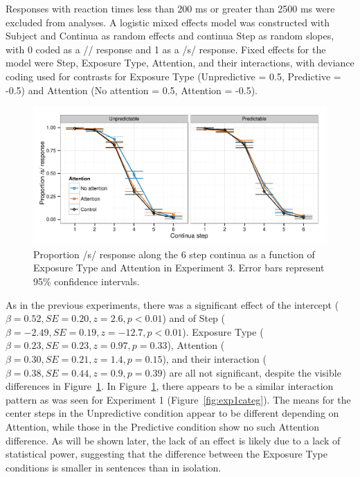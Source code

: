 Responses with reaction times less than 200 ms or greater than 2500 ms were excluded from analyses. 
A logistic mixed effects model was constructed with Subject and Continua as random effects and continua Step as random slopes, with 0 coded as a /\textesh/ response and 1 as a /s/ response.  Fixed effects for the model were Step, Exposure Type, Attention, and their interactions, with deviance coding used for contrasts for Exposure Type (Unpredictive = 0.5, Predictive = -0.5) and Attention (No attention = 0.5, Attention = -0.5).


\begin{figure}[!ht]
\caption{Proportion /s/ response along the 6 step continua as a function of Exposure Type and Attention in Experiment 3.  Error bars represent 95\% confidence intervals.}
\label{fig:exp3categ}
\begin{center}
\includegraphics[width=\textwidth]{graphs/exp3_categresults}
\end{center}
\end{figure}

As in the previous experiments, there was a significant effect of the intercept ($\beta = 0.52, SE = 0.20, z = 2.6, p < 0.01$) and of Step ($\beta = -2.49, SE = 0.19, z = -12.7, p < 0.01$).
Exposure Type ($\beta = 0.23, SE = 0.23, z = 0.97, p = 0.33$), Attention ($\beta = 0.30, SE = 0.21, z = 1.4, p = 0.15$), and their interaction ($\beta = 0.38, SE = 0.44, z = 0.9, p = 0.39$) are all not significant, despite the visible differences in Figure~\ref{fig:exp3categ}.
In Figure~\ref{fig:exp3categ}, there appears to be a similar interaction pattern as was seen for Experiment 1 (Figure~\ref{fig:exp1categ}).
The means for the center steps in the Unpredictive condition appear to be different depending on Attention, while those in the Predictive condition show no such Attention difference.
As will be shown later, the lack of an effect is likely due to a lack of statistical power, suggesting that the difference between the Exposure Type conditions is smaller in sentences than in isolation.

